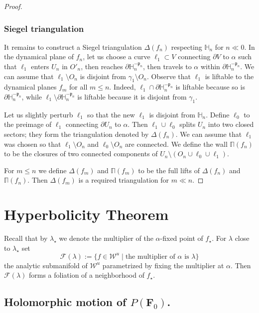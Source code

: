 \documentclass[]{amsart}
\newcommand{\bDelta}{{\mathbb{\Delta}}}
\newcommand{\bPi}{{\mathbb{\Pi}}}
\newcommand\FF{\mathcal{F}}
\newcommand{\bF}{{\mathbf F}}
\newcommand{\fH}{{\mathbb H}}
\newcommand{\str}{{\star}}
\newcommand{\pp}{\mathfrak{p}}
\newcommand\WW{\mathcal{W}}
\theoremstyle{remark}
\numberwithin{equation}{section}
\theoremstyle{definition}
\begin{document}
\begin{proof}
\subsubsection{Siegel triangulation}
It remains to construct a Siegel triangulation $\bDelta(f_n)$ respecting $\fH_n$ for $n\ll0$. In the dynamical plane of $f_n$, let us choose a curve $\ell_1\subset V$ connecting $\partial V$ to $\alpha$ such that $\ell_1$ enters $U_n$ in $O'_n$, then reaches $\partial \fH_{n}^{-\pp_n}$, then travels to $\alpha$ within $\partial  \fH_{n}^{-\pp_n}$. We can assume that $\ell_1\setminus O_n$ is disjoint from $\gamma_1\setminus O_n$. Observe that $\ell_1$ is liftable to the dynamical planes $f_m$ for all $m\le n.$ Indeed, $\ell_1\cap \partial  \fH_{n}^{-\pp_n}$ is liftable because so is $\partial  \fH_{n}^{-\pp_n}$, while  $\ell_1\setminus  \partial  \fH_{n}^{-\pp_n}$ is liftable because it is disjoint from $\gamma_1$.  

Let us slightly perturb $\ell_1$ so that the new $\ell_1$ is disjoint from $\fH_n$. Define $\ell_0$ to the preimage of $\ell_1$ connecting $\partial U_n$ to $\alpha$. Then $\ell_1\cup \ell_0$ splits $U_n$ into two closed sectors; they form the triangulation denoted by $\bDelta(f_n)$. We can assume that $\ell_1$ was chosen so that $\ell_1\setminus O_n$ and $\ell_0\setminus O_n$ are connected. We define the wall $\bPi(f_n)$ to be the closures of two connected components of $U_n\setminus (O_n\cup \ell_0\cup \ell_1).$ 

For $m\le n$ we define $\bDelta(f_m)$ and $\bPi(f_m)$ to be the full lifts of  $\bDelta(f_n)$ and $\bPi(f_n)$. Then $\bDelta(f_m)$ is a required triangulation for $m\ll n$.
\end{proof}

\section{Hyperbolicity Theorem} 
\label{s:HypThm} 


Recall that by $\lambda_\str$ we denote the multiplier of the $\alpha$-fixed point of $f_\str$. For $\lambda$ close to $\lambda_\str$ set 
\[\FF(\lambda):= \{f\in \WW^u \mid \text{the multiplier of $\alpha$ is $\lambda$}\}\]
the analytic submanifold of $\WW^u$ parametrized by fixing the multiplier at $\alpha$. Then $\FF(\lambda)$ forms a foliation of a neighborhood of $f_\str$.


\subsection{Holomorphic motion of $P(\bF_{0})$.}
\end{document}
